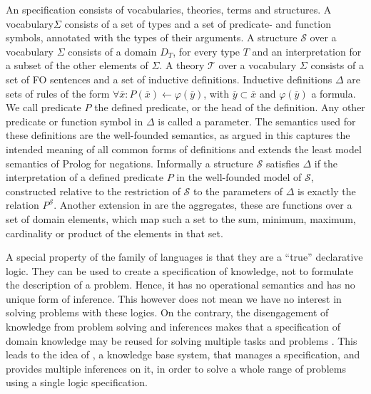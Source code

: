 \documentclass[runningheads]{llncs}
\newcommand{\logicname}[1]{\text{\sc #1}\xspace}
\newcommand{\idp}{\logicname{IDP}}
\newcommand{\fodotidp}{\logicname{FO(\ensuremath{\cdot})\ensuremath{^{\mathtt{IDP}}}}}
\newcommand{\fodot}{\logicname{FO(\ensuremath{\cdot})}}
\begin{document}
An \fodot specification consists of vocabularies, theories, terms and structures.
A vocabulary$\Sigma$ consists of a set of types and a set of predicate- and function symbols, annotated with the types of their arguments. 
A structure $\mathcal{S}$ over a vocabulary $\Sigma$ consists of a domain $D_T$, for every type $T$ and an interpretation for a subset of the other elements of $\Sigma$. 
A theory  $\mathcal{T}$ over a vocabulary $\Sigma$ consists of a set of FO sentences and a set of inductive definitions. 
Inductive definitions $\Delta$ are sets of rules of the form $\forall \overline{x}:P(\overline{x}) \leftarrow \varphi(\overline{y})$, with $\overline{y} \subset \overline{x}$ and $\varphi(\overline{y})$ a \fodotidp formula. 
We call predicate $P$ the defined predicate, or the head of the definition. 
Any other predicate or function symbol in $\Delta$ is called a parameter. 
The semantics used for these definitions are the well-founded semantics, as argued in \cite{tocl/DeneckerT08} this captures the intended meaning of all common forms of definitions  and extends the least model semantics of Prolog for negations. Informally a structure $\mathcal{S}$ satisfies $\Delta$ if the interpretation of a defined predicate $P$ in the well-founded model of $\mathcal{S}$, constructed relative to the restriction of $\mathcal{S}$ to the parameters of $\Delta$ is exactly the relation $P^{\mathcal{S}}$. 
Another extension in \fodotidp are the aggregates, these are functions over a set of domain elements, which map such a set to the sum, minimum, maximum, cardinality or product of the elements in that set.

A special property of the \fodot family of languages is that they are a ``true'' declarative logic. They can be used to create a specification of knowledge, not to formulate the description of a problem. Hence, it has no operational semantics and has no unique form of inference. This however does not mean we have no interest in solving problems with these logics. On the contrary, the disengagement of knowledge from problem solving and inferences makes that a specification of domain knowledge may be reused for solving multiple tasks and  problems \cite{iclp/DeneckerV08}. 
This leads to the idea of \idp, a knowledge base system, that manages a specification, and provides multiple inferences on it, in order to solve a whole range of problems using a single logic specification.
\end{document}
